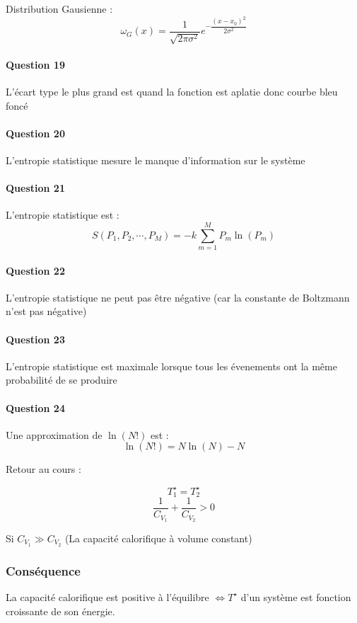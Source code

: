 \documentclass[12pt,a4paper]{report}
\begin{document}
Distribution Gausienne :
\[
	\omega_G(x) = \dfrac{1}{\sqrt{2\pi \sigma^2}} e^{-\dfrac{(x - x_0)^2}{2\sigma^2}}
\]

\paragraph{Question 19}

L'écart type le plus grand est quand la fonction est aplatie donc courbe bleu foncé

\paragraph{Question 20}

L'entropie statistique mesure le manque d'information sur le système

\paragraph{Question 21}

L'entropie statistique est :
\[
	S(P_1, P_2, \cdots, P_M) = -k \sum_{m=1}^M P_m \ln(P_m)
\]

\paragraph{Question 22}

L'entropie statistique ne peut pas être négative (car la constante de Boltzmann n'est pas négative)

\paragraph{Question 23}

L'entropie statistique est maximale lorsque tous les évenements ont la même probabilité de se produire

\paragraph{Question 24}

Une approximation de \(\ln(N!)\) est :
\[
	\ln(N!) = N \ln(N) - N
\]

Retour au cours :

\[
	T_1^\star = T_2^\star
\]
\[
	\dfrac{1}{C_{V_1}} + \dfrac{1}{C_{V_2}} > 0
\]


Si \(C_{V_1} \gg C_{V_2}\) (La capacité calorifique à volume constant)
\subsubsection{Conséquence}
	La capacité calorifique est positive à l'équilibre \(\Leftrightarrow T^\star\) d'un système est 	fonction croissante de son énergie.
\end{document}
